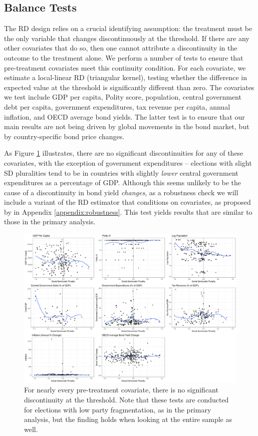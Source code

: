 \documentclass[12pt]{article}
\begin{document}
\subsection{Balance Tests}

The RD design relies on a crucial identifying assumption: the treatment must be the only variable that changes discontinuously at the threshold. If there are any other covariates that do so, then one cannot attribute a discontinuity in the outcome to the treatment alone. We perform a number of tests to ensure that pre-treatment covariates meet this continuity condition. For each covariate, we estimate a local-linear RD (triangular kernel), testing whether the difference in expected value at the threshold is significantly different than zero. The covariates we test include GDP per capita, Polity score, population, central government debt per capita, government expenditures, tax revenue per capita, annual inflation, and OECD average bond yields. The latter test is to ensure that our main results are not being driven by global movements in the bond market, but by country-specific bond price changes. 

As Figure \ref{fig:balanceplots} illustrates, there are no significant discontinuities for any of these covariates, with the exception of government expenditures -- elections with slight SD pluralities tend to be in countries with slightly \textit{lower} central government expenditures as a percentage of GDP. Although this seems unlikely to be the cause of a discontinuity in bond yield \textit{changes}, as a robustness check we will include a variant of the RD estimator that conditions on covariates, as proposed by \citet{Calonico2018} in Appendix \ref{appendix:robustness}. This test yields results that are similar to those in the primary analysis.

\begin{figure}
\centering
\includegraphics[width=\linewidth]{Figures/balancePlots}
\caption{For nearly every pre-treatment covariate, there is no significant discontinuity at the threshold. Note that these tests are conducted for elections with low party fragmentation, as in the primary analysis, but the finding holds when looking at the entire sample as well.}
\label{fig:balanceplots}
\end{figure}
\end{document}
